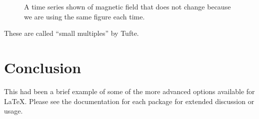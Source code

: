 \documentclass[]{aiaa-tc}%
\begin{document}
\begin{figure}
\begin{subfigmatrix}{4}
 \end{subfigmatrix}
 \caption{A time series shown of magnetic field that does not change
          because we are using the same figure each time.}
 \label{f:small_multiple}
\end{figure}
These are called ``small multiples'' by Tufte.\cite{tufte:83bk}

\section{Conclusion}

This had been a brief example of some of the more advanced options
available for \LaTeX.
Please see the documentation for each package for extended discussion or
usage.



\end{document}
